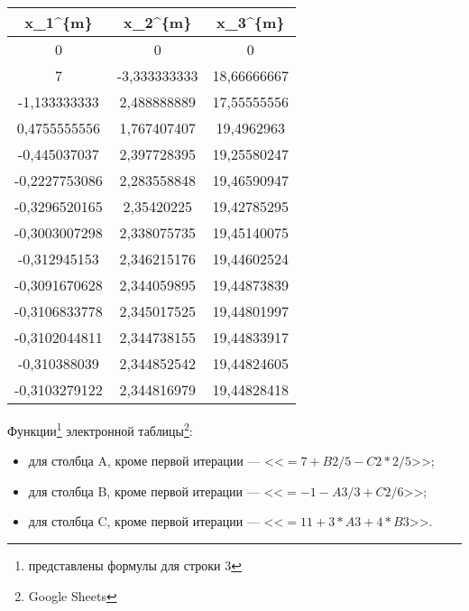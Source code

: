\documentclass[10pt, a4paper, titlepage]{article}
\begin{document}
\begin{center}
    \begin{tabular}{|*{3}{C|}}
        \hline
        x_1^{\{m\}} & x_2^{\{m\}} & x_3^{\{m\}} \\ \hline
        
        0 & 0 & 0 \\ \hline
        
        7 & -3,333333333 & 18,66666667 \\ \hline
        
        -1,133333333 & 2,488888889 & 17,55555556 \\ \hline
        
        0,4755555556 & 1,767407407 & 19,4962963 \\ \hline
        
        -0,445037037 & 2,397728395 & 19,25580247 \\ \hline
        
        -0,2227753086 & 2,283558848 & 19,46590947 \\ \hline
        
        -0,3296520165 & 2,35420225 & 19,42785295 \\ \hline
        
        -0,3003007298 & 2,338075735 & 19,45140075 \\ \hline
        
        -0,312945153 & 2,346215176 & 19,44602524 \\ \hline
        
        -0,3091670628 & 2,344059895 & 19,44873839 \\ \hline
        
        -0,3106833778 & 2,345017525 & 19,44801997 \\ \hline
        
        -0,3102044811 & 2,344738155 & 19,44833917 \\ \hline
        
        -0,310388039 & 2,344852542 & 19,44824605 \\ \hline
        
        -0,3103279122 & 2,344816979 & 19,44828418 \\ \hline
        
    \end{tabular}
\end{center}

Функции\footnote{представлены формулы для строки 3} электронной таблицы\footnote{Google Sheets}:
\begin{itemize}
    \item для столбца A, кроме первой итерации --- <<$=7+B2/5-C2*2/5$>>;
    
    \item для столбца B, кроме первой итерации  --- <<$=-1-A3/3+C2/6$>>;
    
    \item для столбца C, кроме первой итерации --- <<$=11+3*A3+4*B3$>>.
    
\end{itemize}
\end{document}
